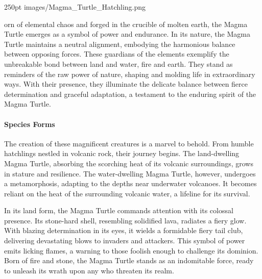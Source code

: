\documentclass[letterpaper,openany,twoside,twocolumn]{book}
\begin{document}

\MonsterSheetGeometry

\mainmatter%


\MonsterFooterGraphic{0pt}%
	{250pt}%
	{images/Magma_Turtle_Hatchling.png}%
	{}%
	

\entryfont \noindent {}orn of elemental chaos and forged in the crucible of molten earth, the Magma Turtle emerges as a symbol of power and endurance. In its nature, the Magma Turtle maintains a neutral alignment, embodying the harmonious balance between opposing forces. These guardians of the elements exemplify the unbreakable bond between land and water, fire and earth. They stand as reminders of the raw power of nature, shaping and molding life in extraordinary ways. With their presence, they illuminate the delicate balance between fierce determination and graceful adaptation, a testament to the enduring spirit of the Magma Turtle. \\

\paragraph{Species Forms} The creation of these magnificent creatures is a marvel to behold. From humble hatchlings nestled in volcanic rock, their journey begins. The land-dwelling Magma Turtle, absorbing the scorching heat of its volcanic surroundings, grows in stature and resilience. The water-dwelling Magma Turtle, however, undergoes a metamorphosis, adapting to the depths near underwater volcanoes. It becomes reliant on the heat of the surrounding volcanic water, a lifeline for its survival.

In its land form, the Magma Turtle commands attention with its colossal presence. Its stone-hard shell, resembling solidified lava, radiates a fiery glow. With blazing determination in its eyes, it wields a formidable fiery tail club, delivering devastating blows to invaders and attackers. This symbol of power emits licking flames, a warning to those foolish enough to challenge its dominion. Born of fire and stone, the Magma Turtle stands as an indomitable force, ready to unleash its wrath upon any who threaten its realm.
\end{document}
